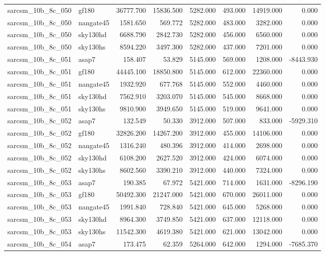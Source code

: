 \begin{tabular}{llrrrrrr}
sarcsm\_10b\_8c\_050 & gf180 & 36777.700 & 15836.500 & 5282.000 & 493.000 & 14919.000 & 0.000 \\
sarcsm\_10b\_8c\_050 & nangate45 & 1581.650 & 569.772 & 5282.000 & 483.000 & 3282.000 & 0.000 \\
sarcsm\_10b\_8c\_050 & sky130hd & 6688.790 & 2842.730 & 5282.000 & 456.000 & 6560.000 & 0.000 \\
sarcsm\_10b\_8c\_050 & sky130hs & 8594.220 & 3497.300 & 5282.000 & 437.000 & 7201.000 & 0.000 \\
sarcsm\_10b\_8c\_051 & asap7 & 158.407 & 53.829 & 5145.000 & 569.000 & 1208.000 & -8443.930 \\
sarcsm\_10b\_8c\_051 & gf180 & 44445.100 & 18850.800 & 5145.000 & 612.000 & 22360.000 & 0.000 \\
sarcsm\_10b\_8c\_051 & nangate45 & 1932.920 & 677.768 & 5145.000 & 552.000 & 4460.000 & 0.000 \\
sarcsm\_10b\_8c\_051 & sky130hd & 7562.910 & 3203.070 & 5145.000 & 545.000 & 8668.000 & 0.000 \\
sarcsm\_10b\_8c\_051 & sky130hs & 9810.900 & 3949.650 & 5145.000 & 519.000 & 9641.000 & 0.000 \\
sarcsm\_10b\_8c\_052 & asap7 & 132.549 & 50.330 & 3912.000 & 507.000 & 833.000 & -5929.310 \\
sarcsm\_10b\_8c\_052 & gf180 & 32826.200 & 14267.200 & 3912.000 & 455.000 & 14106.000 & 0.000 \\
sarcsm\_10b\_8c\_052 & nangate45 & 1316.240 & 480.396 & 3912.000 & 414.000 & 2698.000 & 0.000 \\
sarcsm\_10b\_8c\_052 & sky130hd & 6108.200 & 2627.520 & 3912.000 & 424.000 & 6074.000 & 0.000 \\
sarcsm\_10b\_8c\_052 & sky130hs & 8602.560 & 3390.210 & 3912.000 & 440.000 & 7324.000 & 0.000 \\
sarcsm\_10b\_8c\_053 & asap7 & 190.385 & 67.972 & 5421.000 & 714.000 & 1631.000 & -8296.190 \\
sarcsm\_10b\_8c\_053 & gf180 & 50492.300 & 21247.000 & 5421.000 & 670.000 & 26011.000 & 0.000 \\
sarcsm\_10b\_8c\_053 & nangate45 & 1991.840 & 728.840 & 5421.000 & 645.000 & 5268.000 & 0.000 \\
sarcsm\_10b\_8c\_053 & sky130hd & 8964.300 & 3749.850 & 5421.000 & 637.000 & 12118.000 & 0.000 \\
sarcsm\_10b\_8c\_053 & sky130hs & 11542.300 & 4619.380 & 5421.000 & 621.000 & 13042.000 & 0.000 \\
sarcsm\_10b\_8c\_054 & asap7 & 173.475 & 62.359 & 5264.000 & 642.000 & 1294.000 & -7685.370 \\

\end{tabular}
